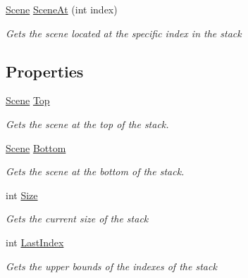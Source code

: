 \begin{DoxyCompactItemize}
\hyperlink{class_midnight_blue_1_1_engine_1_1_scenes_1_1_scene}{Scene} \hyperlink{class_midnight_blue_1_1_engine_1_1_scenes_1_1_scene_stack_a7c391b4275e6e8c72478c3e73560f4df}{Scene\+At} (int index)
\begin{DoxyCompactList}\small\item\em Gets the scene located at the specific index in the stack \end{DoxyCompactList}\end{DoxyCompactItemize}
\subsection*{Properties}
\begin{DoxyCompactItemize}
\item 
\hyperlink{class_midnight_blue_1_1_engine_1_1_scenes_1_1_scene}{Scene} \hyperlink{class_midnight_blue_1_1_engine_1_1_scenes_1_1_scene_stack_ac4f2a2f4f02a64f942724d84b93147fe}{Top}
\begin{DoxyCompactList}\small\item\em Gets the scene at the top of the stack. \end{DoxyCompactList}\item 
\hyperlink{class_midnight_blue_1_1_engine_1_1_scenes_1_1_scene}{Scene} \hyperlink{class_midnight_blue_1_1_engine_1_1_scenes_1_1_scene_stack_acc1654af61556e98cbe9c9ba6956b851}{Bottom}
\begin{DoxyCompactList}\small\item\em Gets the scene at the bottom of the stack. \end{DoxyCompactList}\item 
int \hyperlink{class_midnight_blue_1_1_engine_1_1_scenes_1_1_scene_stack_aa53bbf44549a6642076a045c86c91dfa}{Size}
\begin{DoxyCompactList}\small\item\em Gets the current size of the stack \end{DoxyCompactList}\item 
int \hyperlink{class_midnight_blue_1_1_engine_1_1_scenes_1_1_scene_stack_af627b4608cf7f5bb22ff9610f275fb86}{Last\+Index}
\begin{DoxyCompactList}\small\item\em Gets the upper bounds of the indexes of the stack \end{DoxyCompactList}\end{DoxyCompactItemize}



